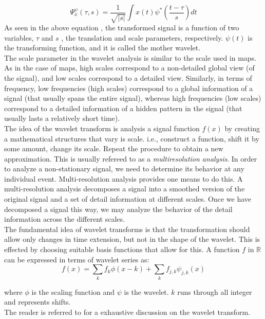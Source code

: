 \documentclass[12pt,english]{report}
\begin{document}
\begin{equation}
\Psi^{\psi}_{x}(\tau, s)=\frac{1}{\sqrt{|s|}}\int{x(t)\psi^*(\frac{t-\tau}{s})dt}
\end{equation}
As seen in the above equation , the transformed signal is a function of two variables, $\tau$ and $s$ , the translation and scale parameters, respectively. $\psi(t)$ is the transforming function, and it is called the mother wavelet.\\

The scale parameter in the wavelet analysis is similar to the scale used in maps. As in the case of maps, high scales correspond to a non-detailed global view (of the signal), and low scales correspond to a detailed view. Similarly, in terms of frequency, low frequencies (high scales) correspond to a global information of a signal (that usually spans the entire signal), whereas high frequencies (low scales) correspond to a detailed information of a hidden pattern in the signal (that usually lasts a relatively short time).\\

The idea of the wavelet transform is analysis a signal function $f(x)$ by creating a mathematical structures that vary is scale. i.e., construct a function, shift it by some amount, change its scale. Repeat the procedure to obtain a new approximation. This is usually refereed to as a \emph{multiresolution analysis}. In order to analyze a non-stationary signal, we need to determine its behavior at any individual event. Multi-resolution analysis provides one means to do this. A multi-resolution analysis decomposes a signal into a smoothed version of the original signal and a set of detail information at different scales. Once we have decomposed a signal this way, we may analyze the behavior of the detail information across the different scales.\\

The fundamental idea of wavelet transforms is that the transformation should allow only changes in time extension, but not in the shape of the wavelet. This is effected by choosing suitable basis functions that allow for this.
A function $f$ in $\mathbb{R}$ can be expressed in terms of wavelet series as:
\begin{equation}
f(x)=\sum\limits_{k}{f_k \phi(x-k)}+\sum\limits_{k}{f_{j,k}\psi_{j,k}(x)}
\end{equation}

where $\phi$ is the scaling function and $\psi$ is the wavelet. $k$ runs through all integer and represents shifts.\\

The reader is referred to \cite{meyer1992wavelets} for a exhaustive discussion on the wavelet transform.\\
\end{document}
